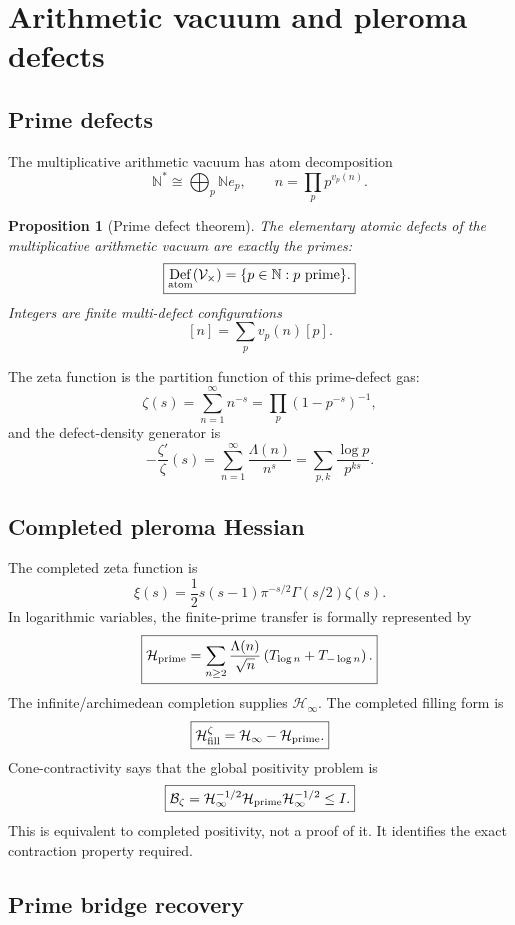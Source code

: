 \documentclass[11pt]{article}
\newtheorem{proposition}[theorem]{Proposition}
\DeclareMathOperator{\Def}{Def}
\newcommand{\Hess}{\mathcal H}
\newcommand{\N}{\mathbb N}
\begin{document}
\section{Arithmetic vacuum and pleroma defects}

\subsection{Prime defects}

The multiplicative arithmetic vacuum has atom decomposition
\[
\boxed{
        \N^*\cong\bigoplus_p\N e_p,
        \qquad
        n=\prod_p p^{v_p(n)}.
}
\]

\begin{proposition}[Prime defect theorem]
The elementary atomic defects of the multiplicative arithmetic vacuum are exactly the primes:
\[
\boxed{
        \Def_{\rm atom}(\mathcal V_\times)=\{p\in\N:p\text{ prime}\}.
}
\]
Integers are finite multi-defect configurations
\[
        [n]=\sum_p v_p(n)[p].
\]
\end{proposition}

The zeta function is the partition function of this prime-defect gas:
\[
        \zeta(s)=\sum_{n=1}^{\infty}n^{-s}=\prod_p(1-p^{-s})^{-1},
\]
and the defect-density generator is
\[
\boxed{
        -\frac{\zeta'}{\zeta}(s)=\sum_{n=1}^{\infty}\frac{\Lambda(n)}{n^s}=\sum_{p,k}\frac{\log p}{p^{ks}}.
}
\]

\subsection{Completed pleroma Hessian}

The completed zeta function is
\[
\boxed{
        \xi(s)=\frac12s(s-1)\pi^{-s/2}\Gamma(s/2)\zeta(s).
}
\]
In logarithmic variables, the finite-prime transfer is formally represented by
\[
\boxed{
        \Hess_{\rm prime}=\sum_{n\ge2}\frac{\Lambda(n)}{\sqrt n}\left(T_{\log n}+T_{-\log n}\right).
}
\]
The infinite/archimedean completion supplies $\Hess_\infty$. The completed filling form is
\[
\boxed{
        \Hess_{\rm fill}^{\zeta}=\Hess_\infty-\Hess_{\rm prime}.
}
\]
Cone-contractivity says that the global positivity problem is
\[
\boxed{
        \mathcal B_\zeta
        =\Hess_\infty^{-1/2}\Hess_{\rm prime}\Hess_\infty^{-1/2}
        \le I.
}
\]
This is equivalent to completed positivity, not a proof of it. It identifies the exact contraction property required.

\subsection{Prime bridge recovery}
\end{document}
